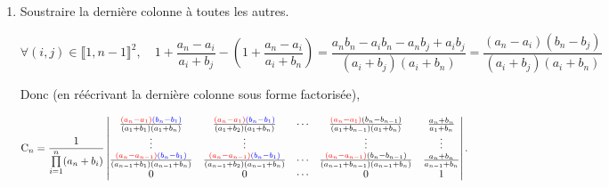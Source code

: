 \begin{itemize}
\begin{enumerate}
        \item Soustraire la dernière colonne à toutes les autres.
        
        $$\forall (i,j) \in \llbracket 1, n-1 \rrbracket^2, \quad 1+\frac{a_n-a_i}{a_i+b_j} - \left( 1+\frac{a_n-a_i}{a_i+b_n} \right)  = \frac{a_n b_n - a_i b_n - a_n b_j + a_i b_j}{(a_i + b_j)(a_i + b_n)} = \frac{(a_n - a_i)(b_n-b_j)}{(a_i + b_j)(a_i + b_n)}$$
        
        Donc (en réécrivant la dernière colonne sous forme factorisée),
        
        
        $$\mathrm{C}_n = \frac{1}{\prod\limits_{i=1}^{n}(a_n + b_i)} \begin{vmatrix}
            \frac{\textcolor{red}{(a_n - a_1)}\textcolor{blue}{(b_n-b_1)}}{(a_1 + b_1)(a_1 + b_n)} & \frac{\textcolor{red}{(a_n - a_1)}\textcolor{blue}{(b_n-b_1)}}{(a_1 + b_2)(a_1 + b_n)} & \cdots & \frac{\textcolor{red}{(a_n - a_1)}(b_n-b_{n-1})}{(a_1 + b_{n-1})(a_1 + b_n)} & \frac{a_n+b_n}{a_1+b_n} \\
            \vdots & \vdots & & \vdots & \vdots \\
            \frac{\textcolor{red}{(a_n - a_{n-1})}\textcolor{blue}{(b_n-b_1)}}{(a_{n-1} + b_1)(a_{n-1} + b_n)} & \frac{\textcolor{red}{(a_n - a_{n-1})}\textcolor{blue}{(b_n-b_1)}}{(a_{n-1} + b_2)(a_{n-1} + b_n)} & \cdots & \frac{\textcolor{red}{(a_n - a_{n-1})}(b_n-b_{n-1})}{(a_{n-1} + b_{n-1})(a_{n-1} + b_n)} & \frac{a_n+b_n}{a_{n-1}+b_n} \\
            0 & 0 & \cdots & 0 & 1
        \end{vmatrix}.$$
        

\end{enumerate}
\end{itemize}
